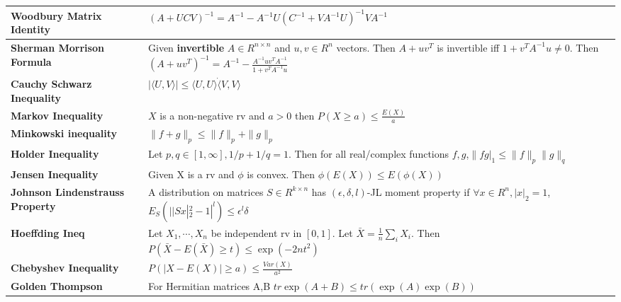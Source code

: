 \documentclass[11pt]{article}
\begin{document}
\begin{tabular}{|>{\raggedright}p{4.5cm}|p{13cm}|} \hline
\textbf{Woodbury Matrix Identity} & $(A+UCV)^{-1} = A^{-1} - A^{-1}U(C^{-1}+VA^{-1}U)^{-1}VA^{-1}$\\ \hline
\textbf{Sherman Morrison Formula} & Given \textbf{invertible} $A \in R^{n\times n}$ and $u,v\in R^n$ vectors. Then $A+uv^T$ is invertible iff $1+v^TA^{-1}u \neq 0$. Then $(A+uv^T)^{-1} = A^{-1}-\frac{A^{-1}uv^TA^{-1}}{1+v^TA^{-1}u}$\\ \hline
\textbf{Cauchy Schwarz Inequality} & $ |\langle U, V \rangle| \leq \langle U, U\rangle \dot \langle V, V\rangle $\\ \hline
\textbf{Markov Inequality} & $X$ is a non-negative rv and $a>0$ then $P(X \geq a) \leq \frac{E(X)}{a}$\\ \hline
\textbf{Minkowski inequality} & $\|f+g\|_p \leq \|f\|_p + \| g\|_p$\\ \hline
\textbf{Holder Inequality} & Let $p,q\in [1, \infty], 1/p+1/q=1$. Then for all real/complex functions $f,g$,$\|fg|_1 \leq \|f\|_p\|g\|_q$\\ \hline
\textbf{Jensen Inequality} & Given X is a rv and $\phi$ is convex. Then $\phi(E(X)) \leq E(\phi(X))$\\ \hline
\textbf{Johnson Lindenstrauss Property} & A distribution on matrices $S\in R^{k \times n}$ has $(\epsilon, \delta, l)$-JL moment property if $\forall x\in R^n, |x|_2=1$, $E_S(||Sx|^2_2-1|^l)\leq \epsilon^l\delta$\\ \hline
\textbf{Hoeffding Ineq} & Let $X_1,\cdots,X_n$ be independent rv in $[0,1]$. Let $\bar{X} = \frac{1}{n}\sum_i{X_i}$. Then $P(\bar{X}-E(\bar{X})\geq t) \leq \exp(-2nt^2)$ \\ \hline
\textbf{Chebyshev Inequality} & $P(|X-E(X)| \geq a) \leq \frac{Var(X)}{a^2}$\\ \hline
\textbf{Golden Thompson} & For Hermitian matrices A,B $tr \exp(A+B) \leq tr(\exp(A)\exp(B))$\\ \hline
\end{tabular}
\end{document}
